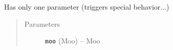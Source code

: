 \documentclass[letterpaper,10pt,english]{sphinxhowto}
\begin{document}

\begin{fulllineitems}
\label{objects:func_without_module2}
\end{fulllineitems}



\begin{fulllineitems}
\end{fulllineitems}


\begin{fulllineitems}
\label{objects:TimeInt}
Has only one parameter (triggers special behavior...)
\begin{quote}\begin{description}
\item[{Parameters}] \leavevmode
\textbf{\texttt{moo}} (Moo) -- Moo

\end{description}\end{quote}

\end{fulllineitems}

\end{document}
